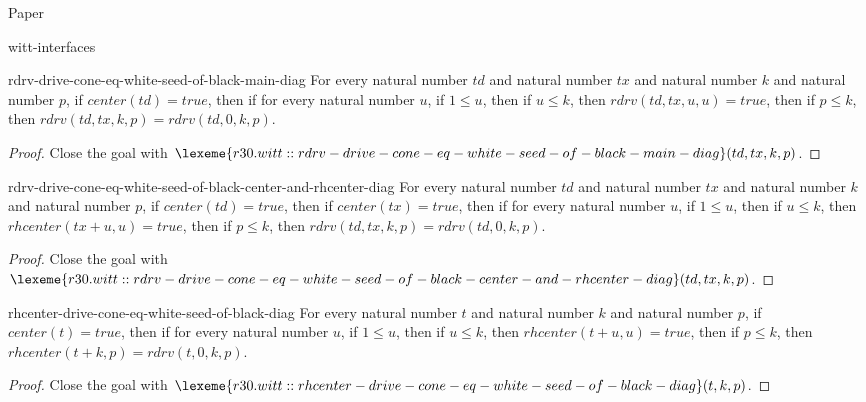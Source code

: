 \begin{lexlean}{Paper}
\begin{section}{witt-interfaces}
  \begin{theorem}{rdrv-drive-cone-eq-white-seed-of-black-main-diag}
  For every natural number \(td\) and natural number \(tx\) and natural number \(k\) and natural number \(p\), if \(center(td) = true\), then if for every natural number \(u\), if \(1 ≤ u\), then if \(u ≤ k\), then \(rdrv(td, tx, u, u) = true\), then if \(p ≤ k\), then \(rdrv(td, tx, k, p) = rdrv(td, 0, k, p)\).
  \begin{proof}
  Close the goal with \(\lexeme{r30.witt::rdrv-drive-cone-eq-white-seed-of-black-main-diag}(td, tx, k, p)\).
  \end{proof}
  \end{theorem}

  \begin{theorem}{rdrv-drive-cone-eq-white-seed-of-black-center-and-rhcenter-diag}
  For every natural number \(td\) and natural number \(tx\) and natural number \(k\) and natural number \(p\), if \(center(td) = true\), then if \(center(tx) = true\), then if for every natural number \(u\), if \(1 ≤ u\), then if \(u ≤ k\), then \(rhcenter(tx + u, u) = true\), then if \(p ≤ k\), then \(rdrv(td, tx, k, p) = rdrv(td, 0, k, p)\).
  \begin{proof}
  Close the goal with \(\lexeme{r30.witt::rdrv-drive-cone-eq-white-seed-of-black-center-and-rhcenter-diag}(td, tx, k, p)\).
  \end{proof}
  \end{theorem}

  \begin{theorem}{rhcenter-drive-cone-eq-white-seed-of-black-diag}
  For every natural number \(t\) and natural number \(k\) and natural number \(p\), if \(center(t) = true\), then if for every natural number \(u\), if \(1 ≤ u\), then if \(u ≤ k\), then \(rhcenter(t + u, u) = true\), then if \(p ≤ k\), then \(rhcenter(t + k, p) = rdrv(t, 0, k, p)\).
  \begin{proof}
  Close the goal with \(\lexeme{r30.witt::rhcenter-drive-cone-eq-white-seed-of-black-diag}(t, k, p)\).
  \end{proof}
  \end{theorem}


\end{section}
\end{lexlean}
